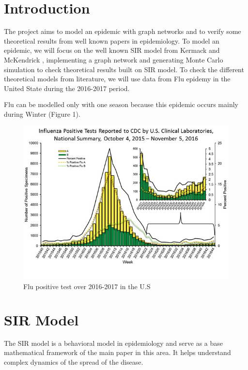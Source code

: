 \section{Introduction}

The project aims to model an epidemic with graph networks and to verify some theoretical results from well known papers in epidemiology. To model an epidemic, we will focus on the well known SIR model from Kermack and McKendrick \cite{Kermack700}, implementing a graph network and generating Monte Carlo simulation to check theoretical results built on SIR model. 
To check the different theoretical models from literature, we will use data from Flu epidemy in the United State during the 2016-2017 period.

Flu can be modelled only with one season because this epidemic occurs mainly during Winter (Figure 1).

\begin{figure}
    \centering
    \includegraphics[scale=0.5]{WHONPHL44_small.jpg}
    \caption{Flu positive test over 2016-2017 in the U.S}
    \label{fig:my_label}
\end{figure}



\section{SIR Model}

The SIR model is a behavioral model in epidemiology and serve as a base mathematical framework of the main paper in this area. It helps understand complex dynamics of the spread of the disease.

